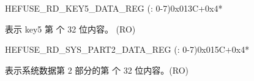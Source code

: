 \begin{register}{H}{EFUSE\_RD\_KEY5\_DATA\_REG (: 0-7)}{0x013C+0x4*}\label{regdesc:EFUSERDKEY5DATANREG}
%
\regnewline%
\begin{regdesc}\begin{reglist}
\label{fielddesc:EFUSEKEY5DATAN}\item [EFUSE\_KEY5\_DATA\regindex{n}] 表示 key5 第  个 32 位内容。 (RO)
\end{reglist}\end{regdesc}
\end{register}


\begin{register}{H}{EFUSE\_RD\_SYS\_PART2\_DATA\_REG (: 0-7)}{0x015C+0x4*}\label{regdesc:EFUSERDSYSPART2DATANREG}
%
\regnewline%
\begin{regdesc}\begin{reglist}
\label{fielddesc:EFUSESYSDATAPART2N}\item [EFUSE\_SYS\_DATA\_PART2\_\regindex{n}] 表示系统数据第 2 部分的第  个 32 位内容。(RO)
\end{reglist}\end{regdesc}
\end{register}


